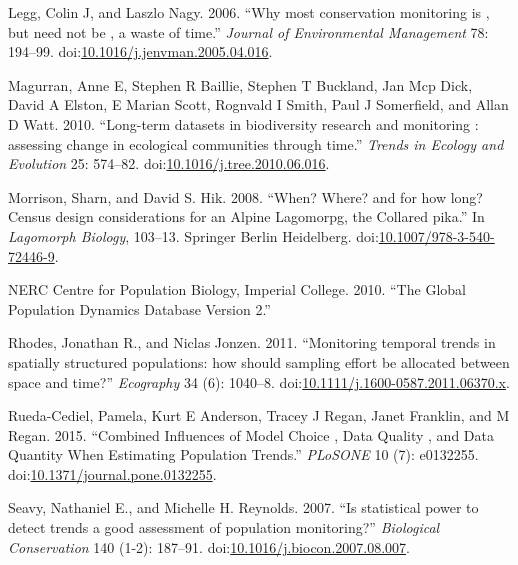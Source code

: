 \documentclass[12pt,]{article}
\begin{document}
\hypertarget{ref-Legg2006}{}
Legg, Colin J, and Laszlo Nagy. 2006. ``Why most conservation monitoring
is , but need not be , a waste of time.'' \emph{Journal of Environmental
Management} 78: 194--99.
doi:\href{https://doi.org/10.1016/j.jenvman.2005.04.016}{10.1016/j.jenvman.2005.04.016}.

\hypertarget{ref-Magurran2010}{}
Magurran, Anne E, Stephen R Baillie, Stephen T Buckland, Jan Mcp Dick,
David A Elston, E Marian Scott, Rognvald I Smith, Paul J Somerfield, and
Allan D Watt. 2010. ``Long-term datasets in biodiversity research and
monitoring : assessing change in ecological communities through time.''
\emph{Trends in Ecology and Evolution} 25: 574--82.
doi:\href{https://doi.org/10.1016/j.tree.2010.06.016}{10.1016/j.tree.2010.06.016}.

\hypertarget{ref-Morrison2008}{}
Morrison, Sharn, and David S. Hik. 2008. ``When? Where? and for how
long? Census design considerations for an Alpine Lagomorpg, the Collared
pika.'' In \emph{Lagomorph Biology}, 103--13. Springer Berlin
Heidelberg.
doi:\href{https://doi.org/10.1007/978-3-540-72446-9}{10.1007/978-3-540-72446-9}.

\hypertarget{ref-GPDD2010}{}
NERC Centre for Population Biology, Imperial College. 2010. ``The Global
Population Dynamics Database Version 2.''

\hypertarget{ref-Rhodes2011}{}
Rhodes, Jonathan R., and Niclas Jonzen. 2011. ``Monitoring temporal
trends in spatially structured populations: how should sampling effort
be allocated between space and time?'' \emph{Ecography} 34 (6): 1040--8.
doi:\href{https://doi.org/10.1111/j.1600-0587.2011.06370.x}{10.1111/j.1600-0587.2011.06370.x}.

\hypertarget{ref-Rueda-Cediel2015}{}
Rueda-Cediel, Pamela, Kurt E Anderson, Tracey J Regan, Janet Franklin,
and M Regan. 2015. ``Combined Influences of Model Choice , Data Quality
, and Data Quantity When Estimating Population Trends.'' \emph{PLoSONE}
10 (7): e0132255.
doi:\href{https://doi.org/10.1371/journal.pone.0132255}{10.1371/journal.pone.0132255}.

\hypertarget{ref-Seavy2007}{}
Seavy, Nathaniel E., and Michelle H. Reynolds. 2007. ``Is statistical
power to detect trends a good assessment of population monitoring?''
\emph{Biological Conservation} 140 (1-2): 187--91.
doi:\href{https://doi.org/10.1016/j.biocon.2007.08.007}{10.1016/j.biocon.2007.08.007}.
\end{document}
